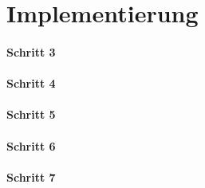 
\part{Implementierung} 





\clearpage
\subsection{Schritt 3}



\clearpage
\subsection{Schritt 4}


\clearpage 
\subsection{Schritt 5}


\clearpage
\subsection{Schritt 6}


\clearpage
\subsection{Schritt 7}
